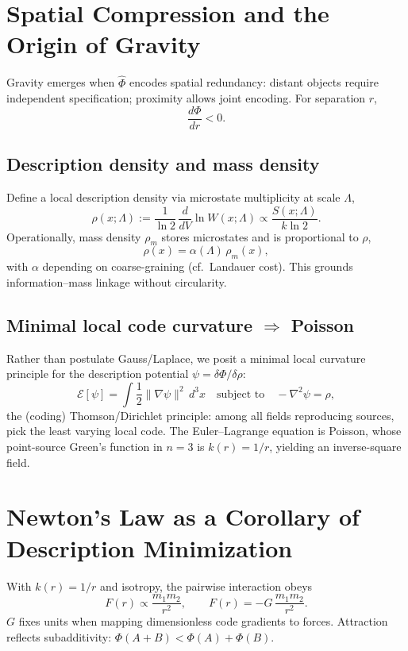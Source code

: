 \documentclass[aps,preprint,onecolumn,longbibliography,nofootinbib]{revtex4-2}
\numberwithin{equation}{section}        %
\begin{document}
\section{Spatial Compression and the Origin of Gravity}
Gravity emerges when $\widehat\Phi$ encodes spatial redundancy: distant objects require independent specification; proximity allows joint encoding. For separation $r$,
\begin{equation}
\frac{d\Phi}{dr} < 0. \label{eq:dphidr}
\end{equation}

\subsection{Description density and mass density}
Define a local description density via microstate multiplicity at scale $\Lambda$,
\begin{equation}
\rho(x;\Lambda) := \frac{1}{\ln 2}\,\frac{d}{dV}\ln W(x;\Lambda)\propto \frac{S(x;\Lambda)}{k\ln 2}.
\end{equation}
Operationally, mass density $\rho_m$ stores microstates and is proportional to $\rho$,
\begin{equation}
\rho(x) = \alpha(\Lambda)\,\rho_m(x), \label{eq:rho}
\end{equation}
with $\alpha$ depending on coarse-graining (cf.\ Landauer cost). This grounds information--mass linkage without circularity.

\subsection{Minimal local code curvature $\Rightarrow$ Poisson}
Rather than postulate Gauss/Laplace, we posit a minimal local curvature principle for the description potential $\psi=\delta\Phi/\delta\rho$:
\begin{equation}
\mathcal{E}[\psi]=\int \frac{1}{2}\|\nabla \psi\|^2\,d^3x \quad \text{subject to}\quad -\nabla^2\psi=\rho, \label{eq:thomson}
\end{equation}
the (coding) Thomson/Dirichlet principle: among all fields reproducing sources, pick the least varying local code. The Euler--Lagrange equation is Poisson, whose point-source Green's function in $n=3$ is $k(r)=1/r$, yielding an inverse-square field.

\section{Newton's Law as a Corollary of Description Minimization}
With $k(r)=1/r$ and isotropy, the pairwise interaction obeys
\begin{equation}
F(r) \propto \frac{m_1 m_2}{r^2}, \qquad F(r) = -G\,\frac{m_1 m_2}{r^2}. \label{eq:newton}
\end{equation}
$G$ fixes units when mapping dimensionless code gradients to forces. Attraction reflects subadditivity: $\Phi(A{+}B) < \Phi(A)+\Phi(B)$.
\end{document}
